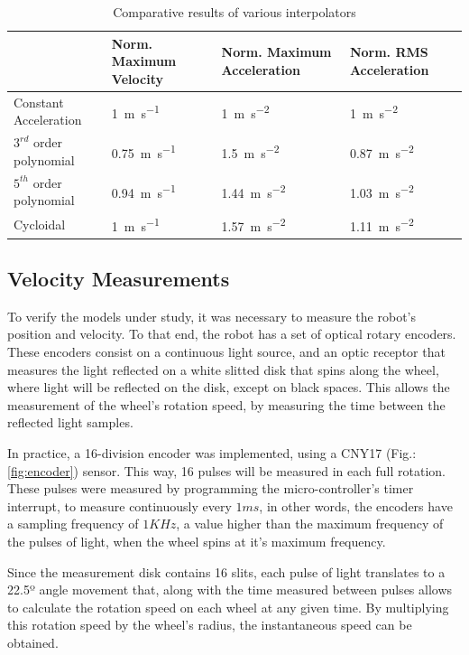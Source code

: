 \documentclass[a4paper]{aadeca}
\begin{document}
\small
\begin{table}[h]
\caption{Comparative results of various interpolators}
\label{table:Interpoladores}
\begin{tabular}{|p{1.5cm}|p{1.5cm}|p{1.5cm}|p{1.5cm}|}
\hline
& Norm. Maximum Velocity & Norm. Maximum Acceleration & Norm. RMS Acceleration\\
\hline
Constant Acceleration & \SI{1}{\metre \per \second} & \SI{1}{\metre \per \second \squared} & \SI{1}{\metre \per \second \squared}\\
\hline
$3^{rd}$ order polynomial & \SI{0.75}{\metre \per \second} & \SI{1.5}{\metre \per \second \squared} & \SI{0.87}{\metre \per \second \squared}\\
\hline
$5^{th}$ order polynomial & \SI{0.94}{\metre \per \second} & \SI{1.44}{\metre \per \second \squared} & \SI{1.03}{\metre \per \second \squared}\\
\hline
Cycloidal & \SI{1}{\metre \per \second} & \SI{1.57}{\metre \per \second \squared} & \SI{1.11}{\metre \per \second \squared}\\
\hline
\end{tabular}
\end{table}
\normalsize

\subsection{Velocity Measurements}

To verify the models under study, it was necessary to measure the robot's position and velocity.
To that end, the robot has a set of optical rotary encoders.
These encoders consist on a continuous light source, and an optic receptor that measures the light reflected on a white slitted disk that spins along the wheel, where light will be reflected on the disk, except on black spaces.
This allows the measurement of the wheel's rotation speed, by measuring the time between the reflected light samples.

In practice, a 16-division encoder was implemented, using a CNY17 (Fig.:\ref{fig:encoder}) sensor.
This way, 16 pulses will be measured in each full rotation.
These pulses were measured by programming the micro-controller's timer interrupt, to measure continuously every $1 ms$, in other words, the encoders have a sampling frequency of $1 KHz$, a value higher than the maximum frequency of the pulses of light, when the wheel spins at it's maximum frequency.

Since the measurement disk contains 16 slits, each pulse of light translates to a 22.5º angle movement that, along with the time measured between pulses allows to calculate the rotation speed on each wheel at any given time.
By multiplying this rotation speed by the wheel's radius, the instantaneous speed can be obtained.
\end{document}
